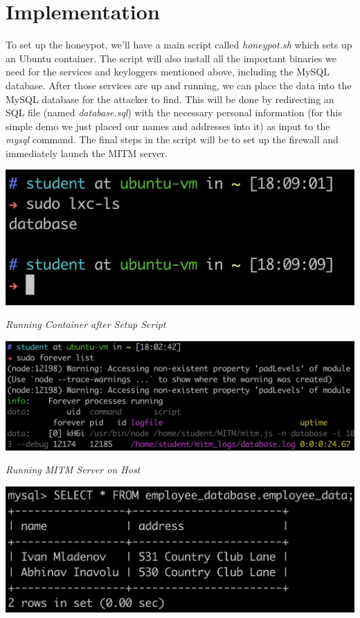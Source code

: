 \documentclass[12pt]{article}
\begin{document}
\section*{\normalsize{Implementation}}
\indent To set up the honeypot, we’ll have a main script called \textit{honeypot.sh} which sets up an Ubuntu container. The script will also install all the important binaries we need for the services and keyloggers mentioned above, including the MySQL database. After those services are up and running, we can place the data into the MySQL database for the attacker to find. This will be done by redirecting an SQL file (named \textit{database.sql}) with the necessary personal information (for this simple demo we just placed our names and addresses into it) as input to the \textit{mysql} command. The final steps in the script will be to set up the firewall and immediately launch the MITM server. \newline
\begin{center} \includegraphics[scale=0.5]{./container.png} \end{center}
\begin{center} \textit{Running Container after Setup Script} \end{center}
\begin{center} \includegraphics[scale=0.25]{./mitm.png} \end{center}
\begin{center} \textit{Running MITM Server on Host} \end{center}
\begin{center} \includegraphics[scale=0.5]{./mysql.png} \end{center}
\end{document}
